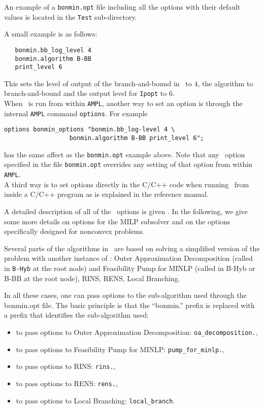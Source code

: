 An example of a {\tt bonmin.opt} file including all the options
with their default values is located in the {\tt Test}
sub-directory.

A small example is as follows:
\begin{verbatim}
   bonmin.bb_log_level 4
   bonmin.algorithm B-BB
   print_level 6
\end{verbatim}
This sets the level of output of the branch-and-bound in \Bonmin\ to $4$, the algorithm to branch-and-bound
and the output level for {\tt Ipopt} to $6$.\\

When \Bonmin\ is run from within {\tt AMPL}, another way to set
an option is through the
internal {\tt AMPL} command {\tt options}.
For example
\begin{verbatim}
options bonmin_options "bonmin.bb_log-level 4 \
                  bonmin.algorithm B-BB print_level 6";
\end{verbatim}
has the same affect as the {\tt bonmin.opt} example above.
Note that any \Bonmin\ option specified in the file {\tt bonmin.opt}
overrides any setting of that option from within {\tt AMPL}.\\

A third way is to set options directly in the C/C++ code when
running \Bonmin\ from inside a C/C++ program as is explained in the reference manual.

A detailed description of all of the \Bonmin\ options is given .
In the following, we give some more details on options for the MILP subsolver and
on the options specifically designed
for nonconvex problems.

\latexhtml{

}{
}

Several parts of the algorithms in \Bonmin\ are based on solving a simplified version of the problem with another instance of \Bonmin:
Outer Approximation Decomposition (called in {\tt B-Hyb} at the root node)
and Feasibility Pump for MINLP (called in B-Hyb or B-BB at the root node), RINS, RENS, Local Branching.

In all these cases, one can pass options to the sub-algorithm used through the bonmin.opt file. The basic principle is
that the ``bonmin.'' prefix  is replaced with a prefix that identifies the sub-algorithm used:
\begin{itemize}
\item to pass options to Outer Approximation Decomposition: {\tt oa\_decomposition.},
\item to pass options to Feasibility Pump for MINLP: {\tt pump\_for\_minlp.},
\item to pass options to RINS: {\tt rins.},
\item to pass options to RENS: {\tt rens.},
\item to pass options to Local Branching: {\tt local\_branch}.
\end{itemize}


